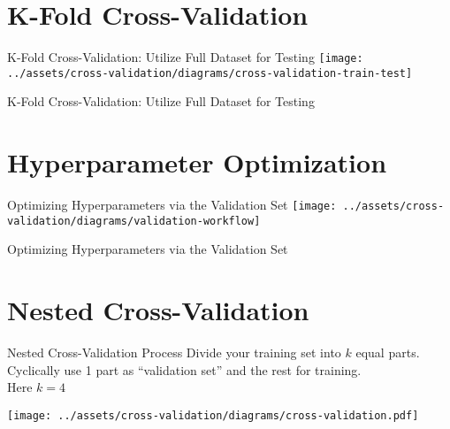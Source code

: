 \documentclass[usenames,dvipsnames]{beamer}
\begin{document}
\section{K-Fold Cross-Validation}

\begin{frame}{K-Fold Cross-Validation: Utilize Full Dataset for Testing}
\texttt{[image: ../assets/cross-validation/diagrams/cross-validation-train-test]}
\end{frame}

\begin{frame}{K-Fold Cross-Validation: Utilize Full Dataset for Testing}
\end{frame}


\section{Hyperparameter Optimization}

\begin{frame}{Optimizing Hyperparameters via the Validation Set}
\texttt{[image: ../assets/cross-validation/diagrams/validation-workflow]}
\end{frame}

\begin{frame}{Optimizing Hyperparameters via the Validation Set}
\end{frame}

\section{Nested Cross-Validation}

\begin{frame}{Nested Cross-Validation Process}
Divide your training set into $k$ equal parts.\\
Cyclically use 1 part as ``validation set'' and the rest for training.\\
Here $k = 4$
\begin{center}
\texttt{[image: ../assets/cross-validation/diagrams/cross-validation.pdf]}
\end{center}
\end{frame}
\end{document}
